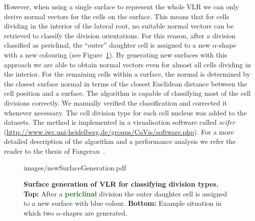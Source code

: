 \documentclass[11pt,a4paper, final]{article}
\begin{document}
%
However, when using a single surface to represent the whole VLR we can only derive normal vectors for the cells on the surface. This means that for cells dividing in the interior of the lateral root, no suitable normal vectors can be retrieved to classify the division orientations. For this reason, after a division classified as periclinal, the ``outer'' daughter cell is assigned to a new $\alpha$-shape with a new colouring (see Figure~\ref{fig:newSurfaceGeneration}). By generating new surfaces with this approach we are able to obtain normal vectors even for almost all cells dividing in the interior. For the remaining cells within a surface, the normal is determined by the closest surface normal in terms of the closest Euclidean distance between the cell position and a surface. The algorithm is capable of classifying most of the cell divisions correctly. We manually verified the classification and corrected it whenever necessary. The cell division type for each cell nucleus was added to the datasets. The method is implemented in a visualisation software called \textit{scifer} (\href{http://www.iwr.uni-heidelberg.de/groups/CoVis/software.php}{http://www.iwr.uni-heidelberg.de/groups/CoVis/software.php}). For a more detailed description of the algorithm and a performance analysis we refer the reader to the thesis of Fangerau~\cite[chapter 4]{FangerauDiss_2015}.
%
\begin{figure}[htbp]
	\begin{center}
		\begin{overpic}[width=0.9\linewidth]{images/newSurfaceGeneration.pdf}
		\end{overpic}
\caption[]
{
{\bf Surface generation of VLR for classifying division types. Top:} After a \textcolor{green}{\textbf{periclinal}} division the outer daughter cell is assigned to a new surface with blue colour. {\bf Bottom:} Example situation in which two $\alpha$-shapes are generated.
}
	\label{fig:newSurfaceGeneration}
	\end{center}
\end{figure}
%
\end{document}
